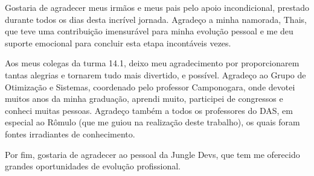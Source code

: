 
\begin{agradecimentos}
Gostaria de agradecer meus irmãos e meus pais pelo apoio incondicional, prestado durante todos os dias desta incrível jornada. Agradeço a minha namorada, Thais, que teve uma contribuição imensurável para minha evolução pessoal e me deu suporte emocional para concluir esta etapa incontáveis vezes.

Aos meus colegas da turma 14.1, deixo meu agradecimento por proporcionarem tantas alegrias e tornarem tudo mais divertido, e possível. Agradeço ao Grupo de Otimização e Sistemas, coordenado pelo professor Camponogara, onde devotei muitos anos da minha graduação, aprendi muito, participei de congressos e conheci muitas pessoas. Agradeço também a todos os professores do DAS, em especial ao Rômulo (que me guiou na realização deste trabalho), os quais foram fontes irradiantes de conhecimento.

Por fim, gostaria de agradecer ao pessoal da Jungle Devs, que tem me oferecido grandes oportunidades de evolução profissional. 

\end{agradecimentos}
